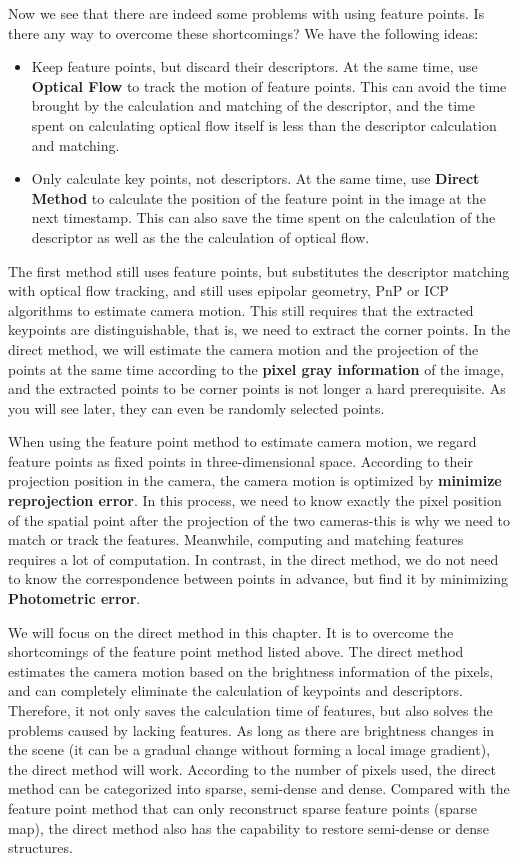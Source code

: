 Now we see that there are indeed some problems with using feature points. Is there any way to overcome these shortcomings? We have the following ideas:

\begin{itemize}
	\item Keep feature points, but discard their descriptors. At the same time, use \textbf{Optical Flow} to track the motion of feature points. This can avoid the time brought by the calculation and matching of the descriptor, and the time spent on calculating optical flow itself is less than the descriptor calculation and matching.
	\item Only calculate key points, not descriptors. At the same time, use \textbf{Direct Method} to calculate the position of the feature point in the image at the next timestamp. This can also save the time spent on the calculation of the descriptor as well as the the calculation of optical flow.	
\end{itemize}

The first method still uses feature points, but substitutes the descriptor matching with optical flow tracking, and still uses epipolar geometry, PnP or ICP algorithms to estimate camera motion. This still requires that the extracted keypoints are distinguishable, that is, we need to extract the corner points. In the direct method, we will estimate the camera motion and the projection of the points at the same time according to the \textbf{pixel gray information} of the image, and the extracted points to be corner points is not longer a hard prerequisite. As you will see later, they can even be randomly selected points.

When using the feature point method to estimate camera motion, we regard feature points as fixed points in three-dimensional space. According to their projection position in the camera, the camera motion is optimized by \textbf{minimize reprojection error}. In this process, we need to know exactly the pixel position of the spatial point after the projection of the two cameras-this is why we need to match or track the features. Meanwhile, computing and matching features requires a lot of computation. In contrast, in the direct method, we do not need to know the correspondence between points in advance, but find it by minimizing \textbf{Photometric error}.

We will focus on the direct method in this chapter. It is to overcome the shortcomings of the feature point method listed above. The direct method estimates the camera motion based on the brightness information of the pixels, and can completely eliminate the calculation of keypoints and descriptors. Therefore, it not only saves the calculation time of features, but also solves the problems caused by lacking features. As long as there are brightness changes in the scene (it can be a gradual change without forming a local image gradient), the direct method will work. According to the number of pixels used, the direct method can be categorized into sparse, semi-dense and dense. Compared with the feature point method that can only reconstruct sparse feature points (sparse map), the direct method also has the capability to restore semi-dense or dense structures.

